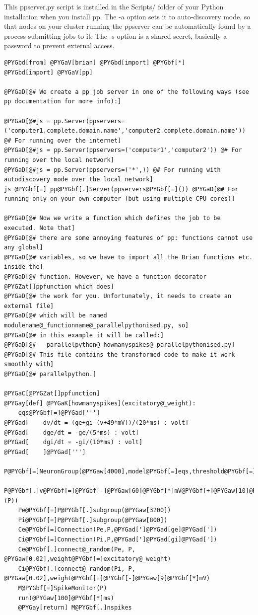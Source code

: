 \documentclass[letterpaper,10pt,english]{manual}
\begin{document}
This ppserver.py script is installed in the Scripts/ folder of your
Python installation when you install pp. The -a option sets it to
auto-discovery mode, so that nodes on your cluster running the ppserver
can be automatically found by a process submitting jobs to it. The -s
option is a shared secret, basically a password to prevent external
access.

\begin{Verbatim}[commandchars=@\[\]]
@PYGbd[from] @PYGaV[brian] @PYGbd[import] @PYGbf[*]
@PYGbd[import] @PYGaV[pp]

@PYGaD[@# We create a pp job server in one of the following ways (see pp documentation for more info):]

@PYGaD[@#js = pp.Server(ppservers=('computer1.complete.domain.name','computer2.complete.domain.name')) @# For running over the internet]
@PYGaD[@#js = pp.Server(ppservers=('computer1','computer2')) @# For running over the local network]
@PYGaD[@#js = pp.Server(ppservers=('*',)) @# For running with autodiscovery mode over the local network]
js @PYGbf[=] pp@PYGbf[.]Server(ppservers@PYGbf[=]()) @PYGaD[@# For running only on your own computer (but using multiple CPU cores)]

@PYGaD[@# Now we write a function which defines the job to be executed. Note that]
@PYGaD[@# there are some annoying features of pp: functions cannot use any global]
@PYGaD[@# variables, so we have to import all the Brian functions etc. inside the]
@PYGaD[@# function. However, we have a function decorator @PYGZat[]ppfunction which does]
@PYGaD[@# the work for you. Unfortunately, it needs to create an external file]
@PYGaD[@# which will be named modulename@_functionname@_parallelpythonised.py, so]
@PYGaD[@# in this example it will be called:]
@PYGaD[@#   parallelpython@_howmanyspikes@_parallelpythonised.py]
@PYGaD[@# This file contains the transformed code to make it work smoothly with]
@PYGaD[@# parallelpython.]

@PYGaC[@PYGZat[]ppfunction]
@PYGay[def] @PYGaK[howmanyspikes](excitatory@_weight):
    eqs@PYGbf[=]@PYGad[''']
@PYGad[    dv/dt = (ge+gi-(v+49*mV))/(20*ms) : volt]
@PYGad[    dge/dt = -ge/(5*ms) : volt]
@PYGad[    dgi/dt = -gi/(10*ms) : volt]
@PYGad[    ]@PYGad[''']
    P@PYGbf[=]NeuronGroup(@PYGaw[4000],model@PYGbf[=]eqs,threshold@PYGbf[=]@PYGbf[-]@PYGaw[50]@PYGbf[*]mV,reset@PYGbf[=]@PYGbf[-]@PYGaw[60]@PYGbf[*]mV)
    P@PYGbf[.]v@PYGbf[=]@PYGbf[-]@PYGaw[60]@PYGbf[*]mV@PYGbf[+]@PYGaw[10]@PYGbf[*]mV@PYGbf[*]rand(@PYGaX[len](P))
    Pe@PYGbf[=]P@PYGbf[.]subgroup(@PYGaw[3200])
    Pi@PYGbf[=]P@PYGbf[.]subgroup(@PYGaw[800])
    Ce@PYGbf[=]Connection(Pe,P,@PYGad[']@PYGad[ge]@PYGad['])
    Ci@PYGbf[=]Connection(Pi,P,@PYGad[']@PYGad[gi]@PYGad['])
    Ce@PYGbf[.]connect@_random(Pe, P, @PYGaw[0.02],weight@PYGbf[=]excitatory@_weight)
    Ci@PYGbf[.]connect@_random(Pi, P, @PYGaw[0.02],weight@PYGbf[=]@PYGbf[-]@PYGaw[9]@PYGbf[*]mV)
    M@PYGbf[=]SpikeMonitor(P)
    run(@PYGaw[100]@PYGbf[*]ms)
    @PYGay[return] M@PYGbf[.]nspikes


\end{Verbatim}
\end{document}

